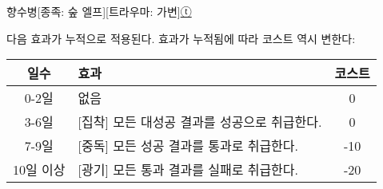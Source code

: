 \documentclass{report}
\begin{document}
	\begin{story}{향수병}{[종족: 숲 엘프][트라우마: 가변]\hyperlink{celesteela}{ⓣ}}
		
		{다음 효과가 누적으로 적용된다. 효과가 누적됨에 따라 코스트 역시 변한다:
		\begin{center}
			\begin{tabular}{c|l|c}
				\textbf{일수}      & \textbf{효과}                                & \textbf{코스트}\\\hline\hline
				0-2일              & 없음                                         & 0              \\\hline
				3-6일              & [집착] 모든 대성공 결과를 성공으로 취급한다. & 0              \\\hline
				7-9일              & [중독] 모든 성공 결과를 통과로 취급한다.     & -10            \\\hline
				10일 이상          & [광기] 모든 통과 결과를 실패로 취급한다.     & -20            \\
			\end{tabular}
		\end{center}}
		
	\end{story}
\end{document}
